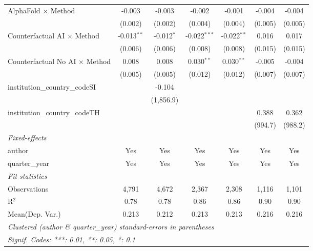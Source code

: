 \begin{tabular}{lcccccc}
   AlphaFold $\times$ Method             & -0.003         & -0.003        & -0.002         & -0.001        & -0.004        & -0.004\\   
                                         & (0.002)        & (0.002)       & (0.004)        & (0.004)       & (0.005)       & (0.005)\\   
   Counterfactual AI $\times$ Method     & -0.013$^{**}$  & -0.012$^{*}$  & -0.022$^{***}$ & -0.022$^{**}$ & 0.016         & 0.017\\   
                                         & (0.006)        & (0.006)       & (0.008)        & (0.008)       & (0.015)       & (0.015)\\   
   Counterfactual No AI $\times$ Method  & 0.008          & 0.008         & 0.030$^{**}$   & 0.030$^{**}$  & -0.005        & -0.004\\   
                                         & (0.005)        & (0.005)       & (0.012)        & (0.012)       & (0.007)       & (0.007)\\   
   institution\_country\_codeSI          &                & -0.104        &                &               &               &   \\   
                                         &                & (1,856.9)     &                &               &               &   \\   
   institution\_country\_codeTH          &                &               &                &               & 0.388         & 0.362\\   
                                         &                &               &                &               & (994.7)       & (988.2)\\   
   \midrule
   \emph{Fixed-effects}\\
   author                                & Yes            & Yes           & Yes            & Yes           & Yes           & Yes\\  
   quarter\_year                         & Yes            & Yes           & Yes            & Yes           & Yes           & Yes\\  
   \midrule
   \emph{Fit statistics}\\
   Observations                          & 4,791          & 4,672         & 2,367          & 2,308         & 1,116         & 1,101\\  
   R$^2$                                 & 0.78           & 0.78          & 0.86           & 0.86          & 0.90          & 0.90\\  
Mean(Dep. Var.) & 0.213 & 0.212 & 0.213 & 0.213 & 0.216 & 0.216 \\
   \midrule \midrule
   \multicolumn{7}{l}{\emph{Clustered (author \& quarter\_year) standard-errors in parentheses}}\\
   \multicolumn{7}{l}{\emph{Signif. Codes: ***: 0.01, **: 0.05, *: 0.1}}\\
\end{tabular}
\par\endgroup
